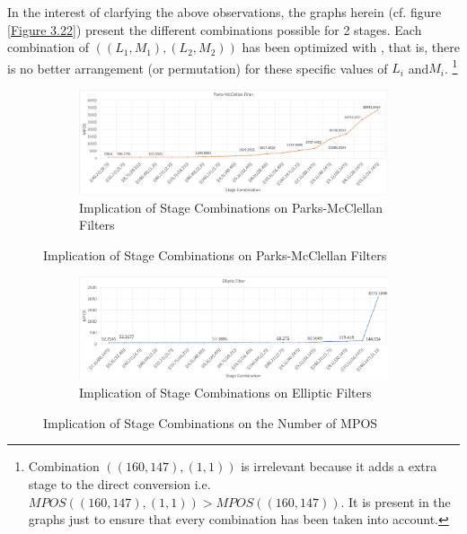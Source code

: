 In the interest of clarfying the above observations, the graphs herein (cf. figure \ref{Figure 3.22}) present the different combinations possible for 2 stages. Each combination of $((L_1,M_1), (L_2,M_2))$ has been optimized with \MATLAB, that is, there is no better arrangement (or permutation) for these specific values of $L_i$ and$ M_i$. \footnote{Combination $((160,147),(1,1))$ is irrelevant because it adds a extra stage to the direct conversion i.e. $MPOS((160,147),(1,1)) > MPOS((160,147))$. It is present in the graphs just to ensure that every combination has been taken into account.}

\vspace*{1cm}

\begin{figure}[htb!]	
	\centering
	\begin{subfigure}[b]{\textwidth}
		\centering
		\centerline{\includegraphics[scale=0.25]{2_stages_PM.png}}
		\caption{Implication of Stage Combinations on Parks-McClellan Filters}\label{Figure 22.a}
	\end{subfigure}
	\par\bigskip
\end{figure}

\begin{figure} [ht!]\ContinuedFloat
	\centering
	\begin{subfigure}[b]{\textwidth}
		\centering
		\centerline{\includegraphics[scale=0.25]{2_stages_ellip.png}}
		\caption{Implication of Stage Combinations on Elliptic Filters}
		\label{Figure 22.b}
	\end{subfigure}
\captionsetup{width=0.95\linewidth}%
\caption{Implication of Stage Combinations on the Number of MPOS}
\end{figure}

